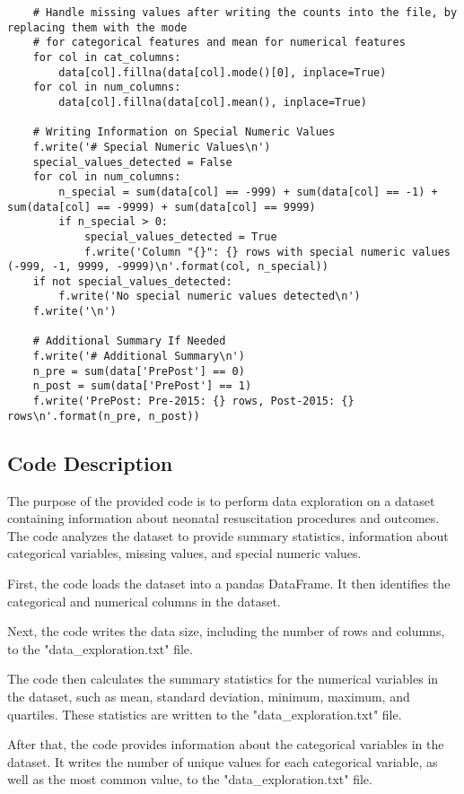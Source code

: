 \documentclass[11pt]{article}
\begin{document}
\begin{verbatim}
    # Handle missing values after writing the counts into the file, by replacing them with the mode
    # for categorical features and mean for numerical features
    for col in cat_columns:
        data[col].fillna(data[col].mode()[0], inplace=True)
    for col in num_columns:
        data[col].fillna(data[col].mean(), inplace=True)

    # Writing Information on Special Numeric Values
    f.write('# Special Numeric Values\n')
    special_values_detected = False
    for col in num_columns:
        n_special = sum(data[col] == -999) + sum(data[col] == -1) + sum(data[col] == -9999) + sum(data[col] == 9999)
        if n_special > 0:
            special_values_detected = True
            f.write('Column "{}": {} rows with special numeric values (-999, -1, 9999, -9999)\n'.format(col, n_special))
    if not special_values_detected:
        f.write('No special numeric values detected\n')
    f.write('\n')

    # Additional Summary If Needed
    f.write('# Additional Summary\n')
    n_pre = sum(data['PrePost'] == 0)
    n_post = sum(data['PrePost'] == 1)
    f.write('PrePost: Pre-2015: {} rows, Post-2015: {} rows\n'.format(n_pre, n_post))

\end{verbatim}

\subsection{Code Description}

The purpose of the provided code is to perform data exploration on a dataset containing information about neonatal resuscitation procedures and outcomes. The code analyzes the dataset to provide summary statistics, information about categorical variables, missing values, and special numeric values. 

First, the code loads the dataset into a pandas DataFrame. It then identifies the categorical and numerical columns in the dataset.

Next, the code writes the data size, including the number of rows and columns, to the "data\_exploration.txt" file.

The code then calculates the summary statistics for the numerical variables in the dataset, such as mean, standard deviation, minimum, maximum, and quartiles. These statistics are written to the "data\_exploration.txt" file.

After that, the code provides information about the categorical variables in the dataset. It writes the number of unique values for each categorical variable, as well as the most common value, to the "data\_exploration.txt" file.
\end{document}
